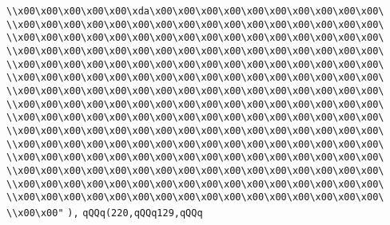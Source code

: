 \verb|\\x00\x00\x00\x00\x00\xda\x00\x00\x00\x00\x00\x00\x00\x00\x00\x00\|\newline
\verb|\\x00\x00\x00\x00\x00\x00\x00\x00\x00\x00\x00\x00\x00\x00\x00\x00\|\newline
\verb|\\x00\x00\x00\x00\x00\x00\x00\x00\x00\x00\x00\x00\x00\x00\x00\x00\|\newline
\verb|\\x00\x00\x00\x00\x00\x00\x00\x00\x00\x00\x00\x00\x00\x00\x00\x00\|\newline
\verb|\\x00\x00\x00\x00\x00\x00\x00\x00\x00\x00\x00\x00\x00\x00\x00\x00\|\newline
\verb|\\x00\x00\x00\x00\x00\x00\x00\x00\x00\x00\x00\x00\x00\x00\x00\x00\|\newline
\verb|\\x00\x00\x00\x00\x00\x00\x00\x00\x00\x00\x00\x00\x00\x00\x00\x00\|\newline
\verb|\\x00\x00\x00\x00\x00\x00\x00\x00\x00\x00\x00\x00\x00\x00\x00\x00\|\newline
\verb|\\x00\x00\x00\x00\x00\x00\x00\x00\x00\x00\x00\x00\x00\x00\x00\x00\|\newline
\verb|\\x00\x00\x00\x00\x00\x00\x00\x00\x00\x00\x00\x00\x00\x00\x00\x00\|\newline
\verb|\\x00\x00\x00\x00\x00\x00\x00\x00\x00\x00\x00\x00\x00\x00\x00\x00\|\newline
\verb|\\x00\x00\x00\x00\x00\x00\x00\x00\x00\x00\x00\x00\x00\x00\x00\x00\|\newline
\verb|\\x00\x00\x00\x00\x00\x00\x00\x00\x00\x00\x00\x00\x00\x00\x00\x00\|\newline
\verb|\\x00\x00\x00\x00\x00\x00\x00\x00\x00\x00\x00\x00\x00\x00\x00\x00\|\newline
\verb|\\x00\x00\x00\x00\x00\x00\x00\x00\x00\x00\x00\x00\x00\x00\x00\x00\|\newline
\verb|\\x00\x00"|\newline
\verb|),|\newline
\verb|qQQq(220,qQQq129,qQQq|\newline
